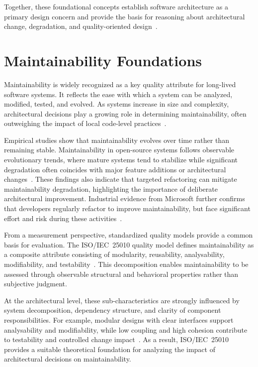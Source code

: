 Together, these foundational concepts establish software architecture as a primary design concern and provide the basis for reasoning about architectural change, degradation, and quality-oriented design~\cite{bass2021software}.

\section{Maintainability Foundations}

Maintainability is widely recognized as a key quality attribute for long-lived software systems. It reflects the ease with which a system can be analyzed, modified, tested, and evolved. As systems increase in size and complexity, architectural decisions play a growing role in determining maintainability, often outweighing the impact of local code-level practices~\cite{bass2021software}.

Empirical studies show that maintainability evolves over time rather than remaining stable. Maintainability in open-source systems follows observable evolutionary trends, where mature systems tend to stabilize while significant degradation often coincides with major feature additions or architectural changes~\cite{molnar2020study}. These findings also indicate that targeted refactoring can mitigate maintainability degradation, highlighting the importance of deliberate architectural improvement. Industrial evidence from Microsoft further confirms that developers regularly refactor to improve maintainability, but face significant effort and risk during these activities~\cite{kim2014refactoring}.

From a measurement perspective, standardized quality models provide a common basis for evaluation. The ISO/IEC~25010 quality model defines maintainability as a composite attribute consisting of modularity, reusability, analysability, modifiability, and testability~\cite{ISO25010}. This decomposition enables maintainability to be assessed through observable structural and behavioral properties rather than subjective judgment.

At the architectural level, these sub-characteristics are strongly influenced by system decomposition, dependency structure, and clarity of component responsibilities. For example, modular designs with clear interfaces support analysability and modifiability, while low coupling and high cohesion contribute to testability and controlled change impact~\cite{ISO25010, bass2021software}. As a result, ISO/IEC~25010 provides a suitable theoretical foundation for analyzing the impact of architectural decisions on maintainability.

